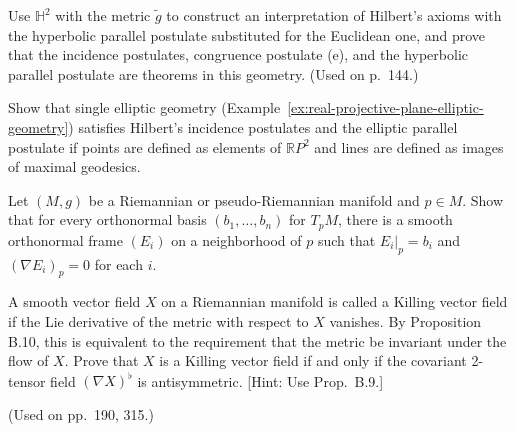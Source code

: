 \begin{exercise}
\label{prob:hyperbolic-geometry-hilbert-axioms}

Use $\mathbb{H}^2$ with the metric $\tilde{g}$ to construct an interpretation of Hilbert's axioms with the hyperbolic parallel postulate substituted for the Euclidean one, and prove that the incidence postulates, congruence postulate (e), and the hyperbolic parallel postulate are theorems in this geometry. (Used on p.\ 144.)
\end{exercise}

\begin{exercise}
\label{prob:elliptic-geometry-hilbert}

Show that single elliptic geometry (Example~\ref{ex:real-projective-plane-elliptic-geometry}) satisfies Hilbert's incidence postulates and the elliptic parallel postulate if points are defined as elements of $\mathbb{R}P^2$ and lines are defined as images of maximal geodesics.
\end{exercise}

\begin{exercise}
\label{prob:orthonormal-frame-zero-covariant-derivative}

Let $(M,g)$ be a Riemannian or pseudo-Riemannian manifold and $p \in M$. Show that for every orthonormal basis $(b_1,\ldots,b_n)$ for $T_pM$, there is a smooth orthonormal frame $(E_i)$ on a neighborhood of $p$ such that $E_i|_p = b_i$ and $(\nabla E_i)_p = 0$ for each $i$.
\end{exercise}

\begin{exercise}
\label{prob:killing-vector-field}

A smooth vector field $X$ on a Riemannian manifold is called a Killing vector field if the Lie derivative of the metric with respect to $X$ vanishes. By Proposition B.10, this is equivalent to the requirement that the metric be invariant under the flow of $X$. Prove that $X$ is a Killing vector field if and only if the covariant 2-tensor field $(\nabla X)^\flat$ is antisymmetric. [Hint: Use Prop.\ B.9.]

(Used on pp.\ 190, 315.)
\end{exercise}

